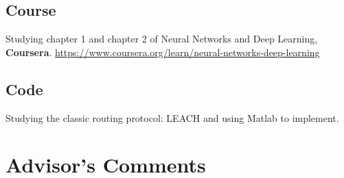 \documentclass[11pt]{report}
\begin{document}
	\subsection{Course} 
	Studying chapter 1 and chapter 2 of Neural Networks and Deep Learning, \textbf{Coursera}. \url{https://www.coursera.org/learn/neural-networks-deep-learning}
	\subsection{Code}
	Studying the classic routing protocol: LEACH and using Matlab to implement.
	
	\section{Advisor's Comments}
	
	
	
	
\end{document}
